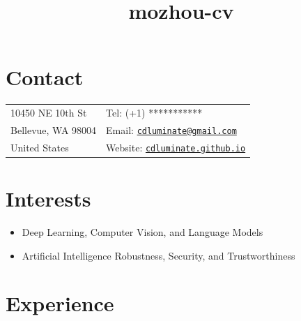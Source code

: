 \documentclass[10pt,margin,line,pifont,palatino,courier]{res}
\newcommand{\email}[1]{\href{mailto:#1}{\tt #1}}
\begin{document}
\title{mozhou-cv}
\begin{resume}

\section{\sc Contact}

\vspace{.05in}
\begin{tabular}{@{}p{2.2in}p{2.2in}}
10450 NE 10th St          & Tel: (+1) *********** \\
Bellevue, WA 98004        & Email: {\small\email{cdluminate@gmail.com}}\\
United States             & Website: {\small\href{https://cdluminate.github.io/}{\tt cdluminate.github.io}}
\end{tabular}

\section{\sc Interests}
\begin{itemize}[noitemsep, leftmargin=*]
    \item Deep Learning, Computer Vision, and Language Models
    \item Artificial Intelligence Robustness, Security, and Trustworthiness
\end{itemize}
 
\section{\sc Experience}


\end{resume}
\end{document}
